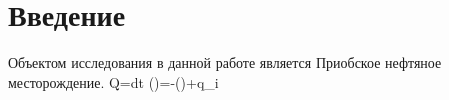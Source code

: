 \chapter*{Введение} %

Объектом исследования в данной работе является Приобское нефтяное месторождение.
\beq
\delta Q=dt
\eeq
\beq
{}\left(\right)=-\nabla\left(\right)+q_i
\eeq
\beq
\omega\varphi
\eeq